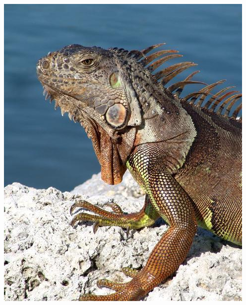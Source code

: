 \documentclass{beamer}
\begin{document}
\begin{frame}
		{\includegraphics[scale=0.14]{imagen/iguana.jpg}}
	\end{frame}
\end{document}
